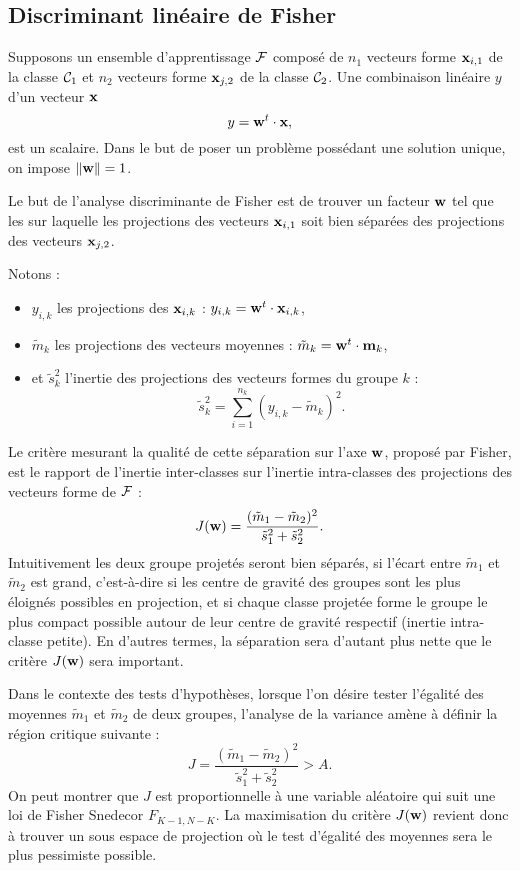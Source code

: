 \subsection{Discriminant lin\'eaire de Fisher}
Supposons un ensemble d'apprentissage 
${\cal F}$  compos\'e de $n_1$ vecteurs forme $\mbox{\bf x}_{i,1}$ de la classe
${\cal C}_1$ et $n_2$ vecteurs forme $\mbox{\bf x}_{j,2}$ de la classe
${\cal C}_2$. Une combinaison lin\'eaire $y$ d'un vecteur $\mbox{\bf x}$
$$
y=\mbox{\bf w}^t \cdot \mbox{\bf x},
$$
est un scalaire. Dans le but de poser un probl\`eme poss\'edant une
solution unique, on impose $\| \mbox{\bf w} \|=1$.


Le but de l'analyse discriminante de Fisher
est de trouver un facteur $\mbox{\bf w}$ tel que les
sur laquelle les
projections des vecteurs $\mbox{\bf x}_{i,1}$ soit bien s\'epar\'ees 
des projections des vecteurs $\mbox{\bf x}_{j,2}$.

Notons :
\begin{itemize}
\item 
$y_{i,k}$ les projections des $\mbox{\bf x}_{i,k}$ : $y_{i,k}= \mbox{\bf w}^t \cdot \mbox{\bf x}_{i,k}$,
\item
$\tilde{m}_k$ les projections des vecteurs moyennes :  $\tilde{m}_k= \mbox{\bf w}^t \cdot \mbox{\bf m}_{k}$,
\item et $\tilde{s}_k^2$ l'inertie des projections des vecteurs formes
du groupe $k$ :
$$
\tilde{s}_k^2= \sum_{i=1}^{n_k} (y_{i,k}-\tilde{m}_k)^2.
$$
\end{itemize}


Le crit\`ere mesurant la qualit\'e de cette s\'eparation sur
l'axe $\mbox{\bf w}$, propos\'e par Fisher, est le rapport de
l'inertie inter-classes sur l'inertie intra-classes 
des projections des vecteurs forme de ${\cal F}$ :
$$
J(\mbox{\bf w})=\frac{(\tilde{m}_1 -\tilde{m}_2)^2}{\tilde{s}_1^2+\tilde{s}_2^2}.
$$
Intuitivement les deux groupe projet\'es seront bien s\'epar\'es,
si l'\'ecart entre $\tilde{m}_1$ et  $\tilde{m}_2$ est grand, c'est-\`a-dire
si les centre de gravit\'e des groupes sont les plus \'eloign\'es possibles
en projection, et si chaque classe projet\'ee forme le groupe le plus
compact possible autour de leur centre de gravit\'e respectif
(inertie intra-classe petite). En d'autres
termes, la s\'eparation sera d'autant plus nette que le crit\`ere
$J(\mbox{\bf w})$ sera important. 

Dans le contexte des tests d'hypoth\`eses, lorsque l'on d\'esire
tester l'\'egalit\'e des moyennes  $\tilde{m}_1$ et  $\tilde{m}_2$ 
de deux groupes, l'analyse
de la variance am\`ene \`a d\'efinir la r\'egion critique suivante :
$$
J=\frac{(\tilde{m}_1- \tilde{m}_2)^2}{\tilde{s}_1^2+\tilde{s}_2^2} > A.
$$
On peut montrer que $J$ est proportionnelle \`a une variable al\'eatoire
qui suit une loi de Fisher Snedecor ${F}_{K-1,N-K}$. La maximisation
du crit\`ere $J(\mbox{\bf w})$ revient donc \`a trouver un sous espace de projection
o\`u le test d'\'egalit\'e des moyennes sera le plus pessimiste possible.


